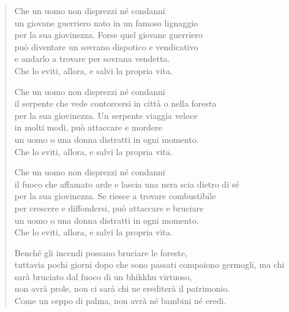 \begin{quote}
Che un uomo non disprezzi né condanni \\
un giovane guerriero nato in un famoso lignaggio \\
per la sua giovinezza. Forse quel giovane guerriero \\
può diventare un sovrano dispotico e vendicativo \\
e andarlo a trovare per sovrana vendetta. \\
Che lo eviti, allora, e salvi la propria vita.

Che un uomo non disprezzi né condanni \\
il serpente che vede contorcersi in città o nella foresta \\
per la sua giovinezza. Un serpente viaggia veloce \\
in molti modi, può attaccare e mordere \\
un uomo o una donna distratti in ogni momento. \\
Che lo eviti, allora, e salvi la propria vita.

Che un uomo non disprezzi né condanni \\
il fuoco che affamato arde e lascia una nera scia dietro di sé \\
per la sua giovinezza. Se riesce a trovare combustibile \\
per crescere e diffondersi, può attaccare e bruciare \\
un uomo o una donna distratti in ogni momento. \\
Che lo eviti, allora, e salvi la propria vita.

Benché gli incendi possano bruciare le foreste, \\
tuttavia pochi giorni dopo che sono passati compaiono germogli, ma chi sarà
bruciato dal fuoco di un bhikkhu virtuoso, \\
non avrà prole, non ci sarà chi ne erediterà il patrimonio. \\
Come un ceppo di palma, non avrà né bambini né eredi.


\end{quote}
